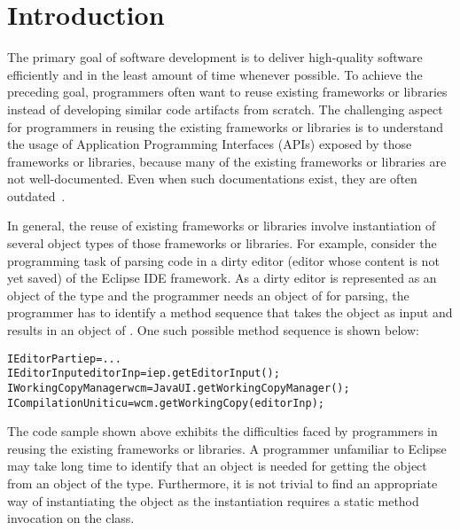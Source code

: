 \section{Introduction}
\label{sec:introduction}

The primary goal of software development is to deliver high-quality
software efficiently and in the least amount of time whenever
possible. To achieve the preceding goal, programmers often want to
reuse existing frameworks or libraries instead of developing similar
code artifacts from scratch. The challenging aspect for
programmers in reusing the existing frameworks or libraries is to
understand the usage of Application Programming Interfaces (APIs)
exposed by those frameworks or libraries, because many of the
existing frameworks or libraries are not well-documented. Even when
such documentations exist, they are often outdated~\cite{document:leth}.

In general, the reuse of existing frameworks or libraries involve
instantiation of several object types of those frameworks or
libraries. For example, consider the programming task of parsing
code in a dirty editor (editor whose content is not yet saved) of
the Eclipse IDE framework. As a dirty editor is represented as an
object of the  type and the programmer needs an
object of  for parsing, the programmer has
to identify a method sequence that takes the  object
as input and results in an object of . One
such possible method sequence is shown below:

\begin{CodeOut}
\begin{alltt}
IEditorPart iep = ...
IEditorInput editorInp = iep.getEditorInput();
IWorkingCopyManager wcm = JavaUI.getWorkingCopyManager();
ICompilationUnit icu = wcm.getWorkingCopy(editorInp);
\end{alltt}
\end{CodeOut}

The code sample shown above exhibits the difficulties faced by
programmers in reusing the existing frameworks or libraries. A
programmer unfamiliar to Eclipse may take
long time to identify that an  object 
is needed for getting the
 object from an object of the
 type. Furthermore, it is not trivial to find
an appropriate way of instantiating the
 object as the instantiation requires a static
method invocation on the  class.

